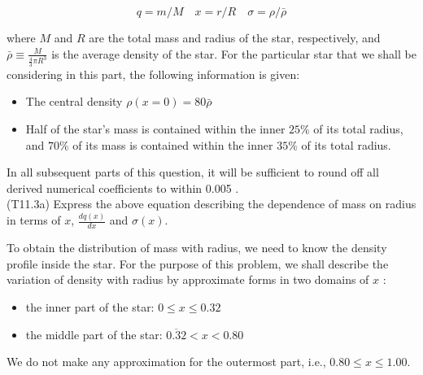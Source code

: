 \documentclass[10pt]{article}
\begin{document}
    $$
    q=m / M \quad x=r / R \quad \sigma=\rho / \bar{\rho}
    $$
    
    where $M$ and $R$ are the total mass and radius of the star, respectively, and $\bar{\rho} \equiv \frac{M}{\frac{4}{3} \pi R^{3}}$ is the average density of the star. For the particular star that we shall be considering in this part, the following information is given:
    
    \begin{itemize}
      \item The central density $\rho(x=0)=80 \bar{\rho}$
      \item Half of the star's mass is contained within the inner $25 \%$ of its total radius, and $70 \%$ of its mass is contained within the inner $35 \%$ of its total radius.
    \end{itemize}
    
    In all subsequent parts of this question, it will be sufficient to round off all derived numerical coefficients to within 0.005 .\\
    (T11.3a) Express the above equation describing the dependence of mass on radius in terms of $x$, $\frac{d q(x)}{d x}$ and $\sigma(x)$.
    
    To obtain the distribution of mass with radius, we need to know the density profile inside the star. For the purpose of this problem, we shall describe the variation of density with radius by approximate forms in two domains of $x$ :
    
    \begin{itemize}
      \item the inner part of the star: $0 \leq x \leq 0.32$
      \item the middle part of the star: $\overline{0.32}<x<0.80$
    \end{itemize}
    
    We do not make any approximation for the outermost part, i.e., $0.80 \leq x \leq 1.00$.
    
\end{document}
